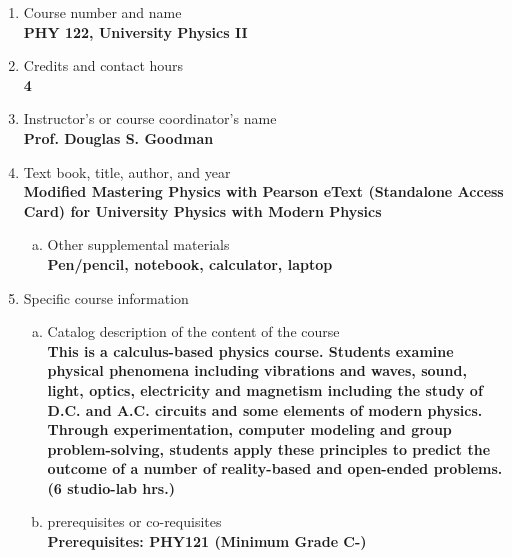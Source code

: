 \label{PHY122}  %
\begin{enumerate}[1.]
\item Course number and name\\
  {\bfseries
PHY 122, University Physics II
  }

\item Credits and contact hours\\
  {\bfseries
4
  }

\item Instructor's or course coordinator's name\\
  {\bfseries
Prof. Douglas S. Goodman
  }

\item Text book, title, author, and year\\
  {\bfseries
    Modified Mastering Physics with Pearson eText (Standalone Access Card) for University Physics with Modern Physics
  }
\begin{enumerate}[a.]
\item Other supplemental materials\\
  {\bfseries
    Pen/pencil, notebook, calculator, laptop
  }
\end{enumerate}

\item Specific course information
\begin{enumerate}[a.]
\item Catalog description of the content of the course\\
  {\bfseries
This is a calculus-based physics course. Students examine physical phenomena including vibrations and waves, sound, light, optics, electricity and magnetism including the study of D.C. and A.C. circuits and some elements of modern physics. Through experimentation, computer modeling and group problem-solving, students apply these principles to predict the outcome of a number of reality-based and open-ended problems. (6 studio-lab hrs.)
  }

\item prerequisites or co-requisites\\
  {\bfseries
    Prerequisites: PHY121 (Minimum Grade C-)
  }


\end{enumerate}
\end{enumerate}
